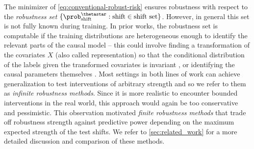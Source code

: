 The minimizer of \cref{eq:conventional-robust-risk} ensures robustness with respect to the \emph{robustness set} $\{\prob^{\thetastar}_{\text{shift}}:\text{shift} \in  \text{shift set}\}$. However, in general this set is not fully known during training. %
In prior works, the robustness set is computable 
if
the training distributions 
are heterogeneous enough
to identify the relevant parts of the causal model --
this could involve finding a 
transformation of the covariates $X$ (also called representation) so that the conditional distribution of the labels given the transformed covariates is invariant \citep{peters2016causal, fan2023environment, magliacane2018domain, rojas2018invariant,arjovsky2020invariant, ahuja2020invariant,
shi2021gradient, 
xie2020risk, krueger2021out, ahuja2021invariance},
or identifying the causal parameters themselves   \citep{angrist1996identification, hartford2017deep, singh2019kernel, bennett2019deep, muandet2020dual}. 
Most settings in both lines of work can achieve
generalization to test interventions of arbitrary strength 
and so we refer to them as \emph{infinite robustness methods}. 
Since it is more realistic to encounter bounded interventions in the real world, this approach would again be too conservative and pessimistic. This observation motivated \emph{finite robustness methods} \citep{rothenhausler2021anchor, jakobsen2022distributional, kook2022distributional, shen2023causality, christiansen2021causal} that trade off robustness strength against predictive power depending on the maximum expected strength of the test shifts. We refer to \cref{sec:related_work} for a more detailed discussion and comparison of these methods. 



